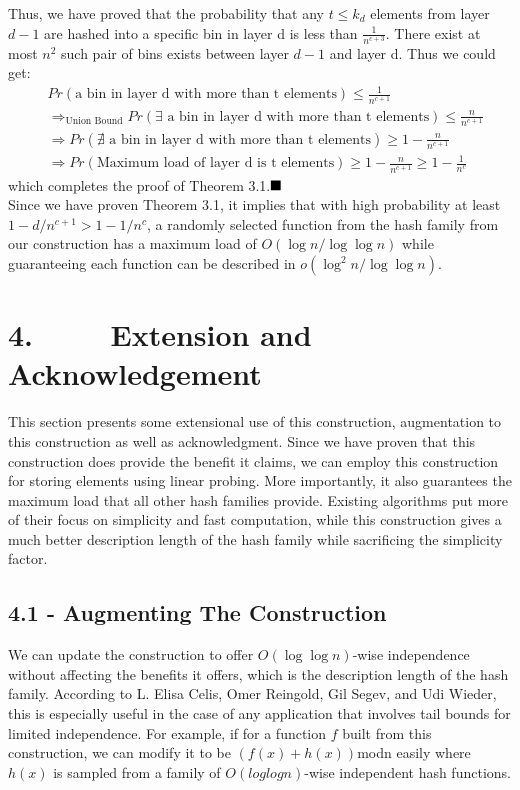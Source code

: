 \documentclass[a4paper, english]{paper}
\begin{document}
Thus, we have proved that the probability that any $t\le k_d$ elements from layer $d-1$ are hashed into a specific bin in layer d is less than $\frac{1}{n^{c+3}}$. There exist at most $n^2$ such pair of bins exists between layer $d-1$ and layer d. Thus we could get:
\begin{align*}
&Pr(\text{a bin in layer d with more than t elements})\le\frac1{n^{c+1}}\\
&\Rightarrow_{\text{Union Bound}} Pr(\exists\text{ a bin in layer d with more than t elements})\le\frac n{n^{c+1}}\\
&\Rightarrow Pr(\nexists\text{ a bin in layer d with more than t elements})\ge 1-\frac n{n^{c+1}}\\
&\Rightarrow Pr(\text{Maximum load of layer d is t elements})\ge 1-\frac n{n^{c+1}}\ge 1-\frac1{n^c}
\end{align*}
which completes the proof of Theorem 3.1.$\hfill\blacksquare$ \\

Since we have proven Theorem 3.1, it implies that with high probability at least $1-d/n^{c+1} > 1-1/n^c$, a randomly selected function from the hash family from our construction has a maximum load of $O(\log n/\log\log n)$ while guaranteeing each function can be described in $o(\log^2 n/\log\log n)$. 


	 \section{4. $\qquad$ Extension and Acknowledgement}
	 This section presents some extensional use of this construction, augmentation to this construction as well as acknowledgment. Since we have proven that this construction does provide the benefit it claims, we can employ this construction for storing elements using linear probing. More importantly, it also guarantees the maximum load that all other hash families provide. Existing algorithms put more of their focus on simplicity and fast computation, while this construction gives a much better description length of the hash family while sacrificing the simplicity factor.
	 
	 \subsection{4.1 - Augmenting The Construction} 
	 We can update the construction to offer $O(\log\log n)$-wise independence without affecting the benefits it offers, which is the description length of the hash family. According to L. Elisa Celis, Omer Reingold, Gil Segev, and Udi Wieder, this is especially useful in the case of any application that involves tail bounds for limited independence. For example, if for a function $f$ built from this construction, we can modify it to be $(f(x)+h(x))$modn easily where $h(x)$ is sampled from a family of $O(loglogn)$-wise independent hash functions. 
	 
\end{document}
